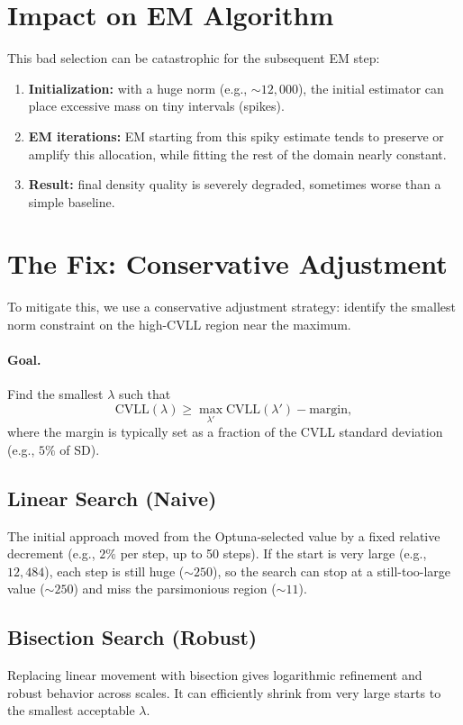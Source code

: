 \documentclass[11pt]{article}
\begin{document}
\section{Impact on EM Algorithm}
This bad selection can be catastrophic for the subsequent EM step:
\begin{enumerate}
    \item \textbf{Initialization:} with a huge norm (e.g., $\sim 12{,}000$), the initial estimator can place excessive mass on tiny intervals (spikes).
    \item \textbf{EM iterations:} EM starting from this spiky estimate tends to preserve or amplify this allocation, while fitting the rest of the domain nearly constant.
    \item \textbf{Result:} final density quality is severely degraded, sometimes worse than a simple baseline.
\end{enumerate}

\section{The Fix: Conservative Adjustment}
To mitigate this, we use a conservative adjustment strategy: identify the smallest norm constraint on the high-CVLL region near the maximum.

\paragraph{Goal.}
Find the smallest $\lambda$ such that
\[
\mathrm{CVLL}(\lambda) \ge \max_{\lambda'} \mathrm{CVLL}(\lambda') - \mathrm{margin},
\]
where the margin is typically set as a fraction of the CVLL standard deviation (e.g., $5\%$ of SD).

\subsection{Linear Search (Naive)}
The initial approach moved from the Optuna-selected value by a fixed relative decrement (e.g., $2\%$ per step, up to 50 steps).  
If the start is very large (e.g., $12{,}484$), each step is still huge ($\sim 250$), so the search can stop at a still-too-large value ($\sim 250$) and miss the parsimonious region ($\sim 11$).

\subsection{Bisection Search (Robust)}
Replacing linear movement with bisection gives logarithmic refinement and robust behavior across scales. It can efficiently shrink from very large starts to the smallest acceptable $\lambda$.
\end{document}
